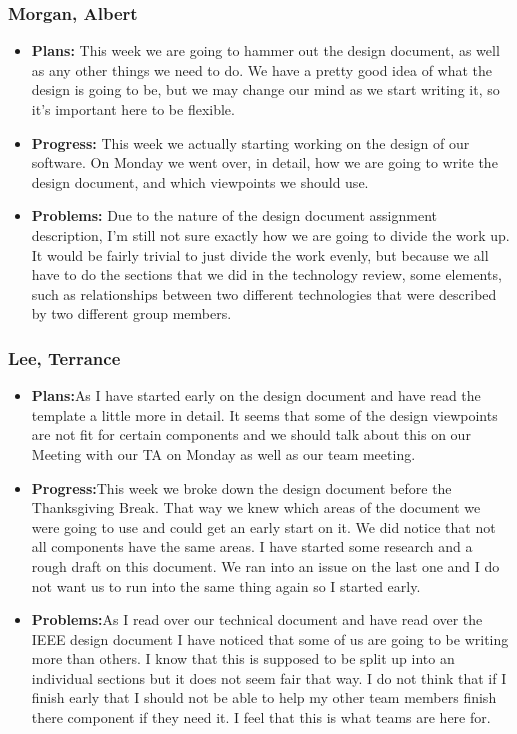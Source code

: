 \documentclass[10pt,draftclsnofoot,onecolumn]{IEEEtran}
\begin{document}
\subsubsection{Morgan, Albert}
\begin{itemize}
	\item \textbf{Plans: }
	This week we are going to hammer out the design document, as well as any other things we need to do. We have a pretty good idea of what the design is going to be, but we may change our mind as we start writing it, so it's important here to be flexible.
	\item \textbf{Progress: }
	This week we actually starting working on the design of our software. On Monday we went over, in detail, how we are going to write the design document, and which viewpoints we should use.
	\item \textbf{Problems: }
	Due to the nature of the design document assignment description, I'm still not sure exactly how we are going to divide the work up. It would be fairly trivial to just divide the work evenly, but because we all have to do the sections that we did in the technology review, some elements, such as relationships between two different technologies that were described by two different group members.
\end{itemize}
\subsubsection{Lee, Terrance}
\begin{itemize}
	\item \textbf{Plans:}As I have started early on the design document and have read the template a little more in detail. It seems that some of the design viewpoints are not fit for certain components and we should talk about this on our Meeting with our TA on Monday as well as our team meeting.
	\item \textbf{Progress:}This week we broke down the design document before the Thanksgiving Break. That way we knew which areas of the document we were going to use and could get an early start on it. We did notice that not all components have the same areas. I have started some research and a rough draft on this document. We ran into an issue on the last one and I do not want us to run into the same thing again so I started early.
	\item \textbf{Problems:}As I read over our technical document and have read over the IEEE design document I have noticed that some of us are going to be writing more than others. I know that this is supposed to be split up into an individual sections but it does not seem fair that way. I do not think that if I finish early that I should not be able to help my other team members finish there component if they need it. I feel that this is what teams are here for.
\end{itemize}
\end{document}
